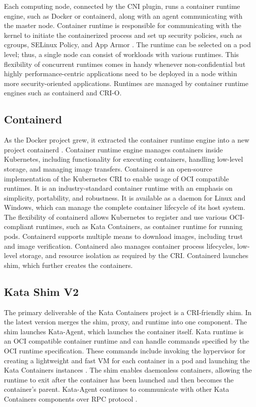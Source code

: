 Each computing node, connected by the CNI plugin, runs a container runtime engine, such as Docker or containerd, along with an agent communicating with the master node. Container runtime is responsible for communicating with the kernel to initiate the containerized process and set up security policies, such as cgroups, SELinux Policy, and App Armor \cite{RedHatCR}. The runtime can be selected on a pod level; thus, a single node can consist of workloads with various runtimes. This flexibility of concurrent runtimes comes in handy whenever non-confidential but highly performance-centric applications need to be deployed in a node within more security-oriented applications. Runtimes are managed by container runtime engines such as containerd and CRI-O.

\subsection{Containerd}

As the Docker project grew, it extracted the container runtime engine into a new project containerd \cite{containerd}. Container runtime engine manages containers inside Kubernetes, including functionality for executing containers, handling low-level storage, and managing image transfers. Containerd is an open-source implementation of the Kubernetes CRI to enable usage of OCI compatible runtimes. It is an industry-standard container runtime with an emphasis on simplicity, portability, and robustness. It is available as a daemon for Linux and Windows, which can manage the complete container lifecycle of its host system. The flexibility of containerd allows Kubernetes to register and use various OCI-compliant runtimes, such as Kata Containers, as container runtime for running pods. Containerd supports multiple means to download images, including trust and image verification. Containerd also manages container process lifecycles, low-level storage, and resource isolation as required by the CRI. Containerd launches shim, which further creates the containers. \cite{containerdGithub}

\subsection{Kata Shim V2}

The primary deliverable of the Kata Containers project is a CRI-friendly shim. In the latest version merges the shim, proxy, and runtime into one component. The shim launches Kata-Agent, which launches the container itself. Kata runtime is an OCI compatible container runtime and can handle commands specified by the OCI runtime specification. These commands include invoking the hypervisor for creating a lightweight and fast VM for each container in a pod and launching the Kata Containers instances \cite{Randazzo2019}. The shim enables daemonless containers, allowing the runtime to exit after the container has been launched and then becomes the container's parent. Kata-Agent continues to communicate with other Kata Containers components over RPC protocol \cite{KataContainersArchitecture}. \cite{Crosby}

